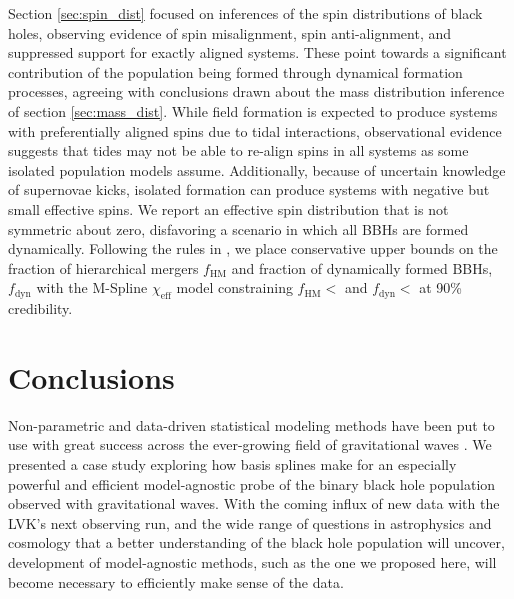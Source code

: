 Section \ref{sec:spin_dist} focused on inferences of the spin distributions of black holes, observing evidence of spin misalignment, spin anti-alignment, and suppressed support 
for exactly aligned systems. These point towards a significant contribution of the population being formed through dynamical formation processes, agreeing with 
conclusions drawn about the mass distribution inference of section \ref{sec:mass_dist}. While field formation is expected to produce systems with preferentially 
aligned spins due to tidal interactions, observational evidence suggests that tides may not be able to re-align spins in all systems as some 
isolated population models assume. Additionally, because of uncertain knowledge of supernovae kicks, isolated formation can produce systems with negative but small effective spins. 
We report an effective spin distribution that is not symmetric about zero, disfavoring a scenario in which all BBHs are formed dynamically. Following the rules in \citet{Fishbach_2022}, 
we place conservative upper bounds on the fraction of hierarchical mergers $f_\mathrm{HM}$ and fraction of dynamically formed BBHs, $f_\mathrm{dyn}$ with 
the M-Spline $\chi_\mathrm{eff}$ model constraining $f_\mathrm{HM} < $\result{$\macros[ChiEffective][chieff][frac_hm][10th percentile]$} 
and $f_\mathrm{dyn} < $ at 90\% credibility. 

\section{Conclusions}\label{sec:conclusion}

Non-parametric and data-driven statistical modeling methods have been put to use with great success across the ever-growing field of gravitational 
waves \citep{B_Farr_etal_2014,Littenberg_2015,Mandel_2016,Edwards_2018,Doctor_GPR,Edelman_2021,Vitale_2021,Tiwari_2021_a,Tiwari_2021_b,Edelman_2022ApJ,Tiwari_2022ApJ}. 
We presented a case study exploring how basis splines make for an especially powerful and efficient model-agnostic probe of the binary black hole population observed 
with gravitational waves. With the coming influx of new data with the LVK's next observing run, and the wide range of questions in astrophysics and cosmology that a better 
understanding of the black hole population will uncover, development of model-agnostic methods, such as the one we proposed here, will become necessary to efficiently make
sense of the data.  

